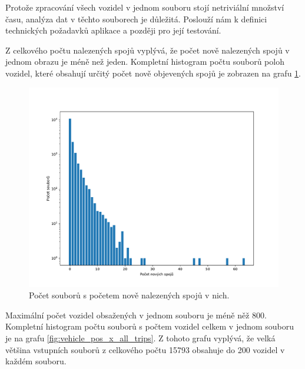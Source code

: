 Protože zpracování všech vozidel v jednom souboru stojí netriviální množství času, analýza dat v těchto souborech je důležitá. Poslouží nám k definici technických požadavků aplikace a později pro její testování.

\bigbreak

Z celkového počtu nalezených spojů vyplývá, že počet nově nalezených spojů v jednom obrazu je méně než jeden. Kompletní histogram počtu souborů poloh vozidel, které obsahují určitý počet nově objevených spojů je zobrazen na grafu \ref{fig:vehicle_pos_x_new_trips}.

\begin{figure}
	\centering
  \includegraphics[width=\linewidth]{../img/new_trips}
  \caption{Počet souborů s početem nově nalezených spojů v nich.}
  \label{fig:vehicle_pos_x_new_trips}
\end{figure}

\bigbreak

Maximální počet vozidel obsažených v jednom souboru je méně něž 800. Kompletní histogram počtu souborů s počtem vozidel celkem v jednom souboru je na grafu \ref{fig:vehicle_pos_x_all_trips}. Z tohoto grafu vyplývá, že velká většina vstupních souborů z celkového počtu 15793 obsahuje do 200 vozidel v každém souboru.

